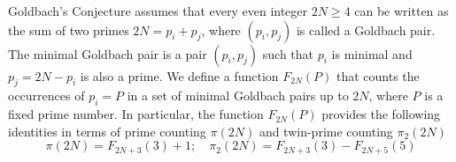 Goldbach's Conjecture assumes that every even integer $2N \geq 4$ can be written as the sum of two primes
$2N = p_i + p_j$, where $(p_i, p_j)$ is called a Goldbach pair.
The minimal Goldbach pair is a pair $(p_i, p_j)$ such that $p_i$ is minimal and $p_j = 2N - p_i$ is also a prime.
We define a function $F_{2N}(P)$ that counts the occurrences of $p_i = P$ in a set of minimal Goldbach pairs
up to $2N$, where $P$ is a fixed prime number.
In particular, the function $F_{2N}(P)$ provides the following identities in terms of prime counting $\pi(2N)$ and
twin-prime counting $\pi_2(2N)$
\[
    \pi(2N) = F_{2N+3}(3) + 1; \quad \pi_2(2N) = F_{2N+3}(3) - F_{2N+5}(5)
\]
